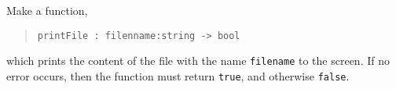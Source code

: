 \label{cat:printFile}
Make a function,
\begin{quote}
  \mbox{\lstinline!printFile : filenname:string -> bool!}
\end{quote}
which prints the content of the file with the name
\lstinline{filename} to the screen. If no error occurs, then the function must
return \lstinline{true}, and otherwise \lstinline{false}.
